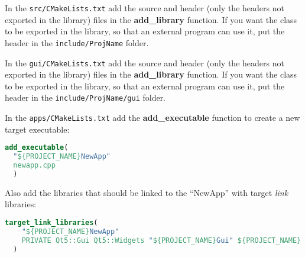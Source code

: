 
In the \texttt{src/CMakeLists.txt} add the source and header (only the
headers not exported in the library) files in the \textbf{add\_library}
function. If you want the class to be exported in the library, so that
an external program can use it, put the header in the
\texttt{include/ProjName} folder.



In the \texttt{gui/CMakeLists.txt} add the source and header (only the
headers not exported in the library) files in the \textbf{add\_library}
function. If you want the class to be exported in the library, so that
an external program can use it, put the header in the
\texttt{include/ProjName/gui} folder.



In the \texttt{apps/CMakeLists.txt} add the \textbf{add\_executable}
function to create a new target executable:

\begin{lstlisting}[language=cmake, gobble=2]
  add_executable(
  "${PROJECT_NAME}NewApp"
  newapp.cpp
  )
\end{lstlisting}

Also add the libraries that should be linked to the ``NewApp'' with
target \emph{link} libraries:

\begin{lstlisting}[language=cmake, gobble=2]
  target_link_libraries(
    "${PROJECT_NAME}NewApp"
    PRIVATE Qt5::Gui Qt5::Widgets "${PROJECT_NAME}Gui" ${PROJECT_NAME} ${SUBMODULES_NAME}
  )
\end{lstlisting}
